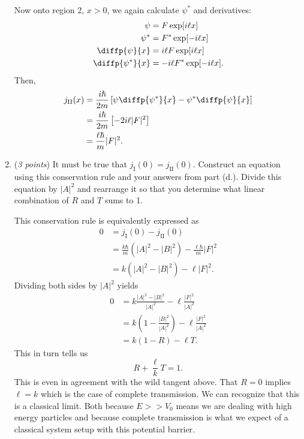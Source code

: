 \documentclass[a4paper, 12pt]{config/homework}
\begin{document}
\begin{enumerate}[label=(\alph*.)]
Now onto region 2, \(x>0\), we again calculate \(\psi^*\) and derivatives:
\begin{align*}
\psi &= F\exp[i\ell x] \\
\psi^* &= F^*\exp[-i\ell x] \\
\diffp{\psi}{x} &= i\ell F \exp[i\ell x] \\
\diffp{\psi^*}{x} &= -i\ell F^* \exp[-i\ell x].
\end{align*}
Then,
\begin{align*}
j_\text{II}(x) &= \frac{i\hbar}{2m}\left[\psi\diffp{\psi^*}{x} - \psi^*\diffp{\psi}{x}\right]
\\&= \frac{i\hbar}{2m}\left[-2i\ell|F|^2\right]
\\&= \frac{\ell \hbar}{m}|F|^2.
\end{align*}

\vspace{\baselineskip}
\item (\textit{3 points}) It must be true that \(j_\text{I}(0)=j_\text{II}(0)\). Construct an equation using this conservation rule and your answers from part (d.). Divide this equation by \(|A|^2\) and rearrange it so that you determine what linear combination of \(R\) and \(T\) sums to 1.

This conservation rule is equivalently expressed as
\begin{align*}
0 &= j_\text{I}(0) - j_\text{II}(0)
\\&= \frac{k\hbar}{m}\left(|A|^2 - |B|^2\right) - \frac{\ell\hbar}{m}|F|^2
\\&= k\left(|A|^2-|B|^2\right) - \ell|F|^2.
\end{align*}
Dividing both sides by \(|A|^2\) yields
\begin{align*}
0 &= k\frac{|A|^2 - |B|^2}{|A|^2} - \ell\frac{|F|^2}{|A|^2}
\\&= k\left(1 - \frac{|B|^2}{|A|^2}\right) - \ell\frac{|F|^2}{|A|^2}
\\&= k\left(1 - R\right) - \ell T.
\end{align*}
This in turn tells us
\[R + \frac{\ell}{k}T = 1.\]
This is even in agreement with the wild tangent above. That \(R=0\) implies \(\ell=k\) which is the case of complete transmission. We can recognize that this is a classical limit. Both because \(E>>V_0\) means we are dealing with high energy particles and because complete transmission is what we expect of a classical system setup with this potential barrier.
\end{enumerate}
\end{document}
